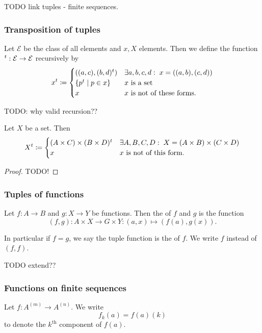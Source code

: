 TODO link tuples - finite sequences.

\subsubsection{Transposition of tuples}
\begin{definition}
Let $\mathcal{E}$ be the class of all elements and $x,X$ elements. Then we define the function $^t: \mathcal{E}\to \mathcal{E}$ recursively by
\[ x^t \coloneqq \begin{cases}
((a,c), (b,d)^t) & \exists a,b,c,d:\; x = ((a,b), (c,d)) \\
\left\{ p^t \;\middle|\; p\in x \right\} & \text{$x$ is a set} \\
x & \text{$x$ is not of these forms.}
\end{cases} \]
\end{definition}
TODO: why valid recursion??
\begin{lemma}
Let $X$ be a set. Then
\[ X^t \coloneqq \begin{cases}
(A\times C) \times (B\times D)^t & \exists A,B,C,D:\; X = (A\times B)\times (C\times D) \\
x & \text{$x$ is not of this form.}
\end{cases} \]
\end{lemma}
\begin{proof}
TODO!
\end{proof}

\subsubsection{Tuples of functions}
\begin{definition}
Let $f: A\to B$ and $g: X\to Y$ be functions. Then the  of $f$ and $g$ is the function
\[ (f,g): A\times X \to G\times Y: (a,x) \mapsto (f(a), g(x)). \]

In particular if $f=g$, we say the tuple function is the  of $f$. We write $f$ instead of $(f,f)$.
\end{definition}

TODO extend??

\subsubsection{Functions on finite sequences}
Let $f: A^{(m)}\to A^{(n)}$. We write
\[ f_k(a) = f(a)(k) \]
to denote the $k^\text{th}$ component of $f(a)$.